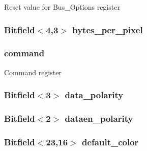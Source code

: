 \label{classHDLcd_aaf19ce46531fc85edba07a0a76b30a5f}
Reset value for Bus\_\-Options register \hypertarget{classHDLcd_a6d40f0125f53451c936adc705f608a2b}{
\subsubsection[{bytes\_\-per\_\-pixel}]{\setlength{\rightskip}{0pt plus 5cm}Bitfield$<$4,3$>$ {\bf bytes\_\-per\_\-pixel}}}
\label{classHDLcd_a6d40f0125f53451c936adc705f608a2b}
\hypertarget{classHDLcd_a9c5f330aee81c99b318a53af189fbc98}{
\subsubsection[{command}]{ {\bf command}}}
\label{classHDLcd_a9c5f330aee81c99b318a53af189fbc98}
Command register \hypertarget{classHDLcd_a82bbce2c586afda0822949bce915be7c}{
\subsubsection[{data\_\-polarity}]{\setlength{\rightskip}{0pt plus 5cm}Bitfield$<$3$>$ {\bf data\_\-polarity}}}
\label{classHDLcd_a82bbce2c586afda0822949bce915be7c}
\hypertarget{classHDLcd_a2e88cca6e78a84d49d34de5407d3d048}{
\subsubsection[{dataen\_\-polarity}]{\setlength{\rightskip}{0pt plus 5cm}Bitfield$<$2$>$ {\bf dataen\_\-polarity}}}
\label{classHDLcd_a2e88cca6e78a84d49d34de5407d3d048}
\hypertarget{classHDLcd_a8ff8f961eef85324f222954cc8ba53ee}{
\subsubsection[{default\_\-color}]{\setlength{\rightskip}{0pt plus 5cm}Bitfield$<$23,16$>$ {\bf default\_\-color}}}
